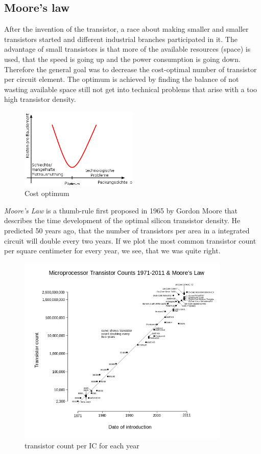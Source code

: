 \documentclass[11pt]{article}
\begin{document}
\subsection{Moore's law}
After the invention of the transistor, a race about making smaller and smaller transistors started and different industrial branches participated in it. The advantage of small transistors is that more of the available resources (space) is used, that the speed is going up and the power consumption is going down. Therefore the general goal was to decrease the cost-optimal number of transistor per circuit element. The optimum is achieved by finding the balance of not wasting available space still not get into technical problems that arise with a too high transistor density. 
\begin{figure}[H]
\centering
\includegraphics[width=0.5\textwidth]{moore_optimum}%
\caption{Cost optimum}
\label{fig:moore_optimum}
\end{figure}

\textit{Moore's Law} is a thumb-rule first proposed in 1965 by Gordon Moore that describes the time development of the optimal silicon transistor density. He predicted 50 years ago, that the number of transistors per area in a integrated circuit will double every two years. If we plot the most common transistor count per square centimeter for every year, we see, that we was quite right. 
\begin{figure}[H]
\centering
\includegraphics[width=0.9\textwidth]{moore}%
\caption{transistor count per IC for each year}
\label{fig:moore}
\end{figure}
\end{document}
